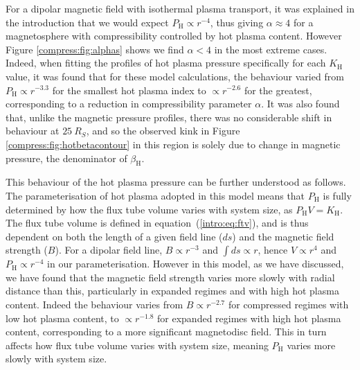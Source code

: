 For a dipolar magnetic field with isothermal plasma transport, it was explained in the introduction that we would expect $P_\mathrm{H} \propto r^{-4}$, thus giving $\alpha \approx 4$ for a magnetosphere with compressibility controlled by hot plasma content. However Figure \ref{compress:fig:alphas} shows we find $\alpha < 4$ in the most extreme cases. Indeed, when fitting the profiles of hot plasma pressure specifically for each $K_\mathrm{H}$ value, it was found that for these model calculations, the behaviour varied from $P_\mathrm{H} \propto r^{-3.3}$ for the smallest hot plasma index to $\propto r^{-2.6}$ for the greatest, corresponding to a reduction in compressibility parameter $\alpha$. It was also found that, unlike the magnetic pressure profiles, there was no considerable shift in behaviour at $\SI{25}{R_S}$, and so the observed kink in Figure \ref{compress:fig:hotbetacontour} in this region is solely due to change in magnetic pressure, the denominator of $\beta_\mathrm{H}$.

This behaviour of the hot plasma pressure can be further understood as follows. The parameterisation of hot plasma adopted in this model means that $P_\mathrm{H}$ is fully determined by how the flux tube volume varies with system size, as $P_\mathrm{H}V=K_\mathrm{H}$. The flux tube volume is defined in equation~(\ref{intro:eq:ftv}), and is thus dependent on both the length of a given field line ($ds$) and the magnetic field strength ($B$). For a dipolar field line, $B \propto r^{-3}$ and $\int ds \propto r$, hence $V \propto r^4$ and $P_\mathrm{H} \propto r^{-4}$ in our parameterisation. However in this model, as we have discussed, we have found that the magnetic field strength varies more slowly with radial distance than this, particularly in expanded regimes and with high hot plasma content. Indeed the behaviour varies from $B \propto r^{-2.7}$ for compressed regimes with low hot plasma content, to $\propto r^{-1.8}$ for expanded regimes with high hot plasma content, corresponding to a more significant magnetodisc field. This in turn affects how flux tube volume varies with system size, meaning $P_\mathrm{H}$ varies more slowly with system size.

